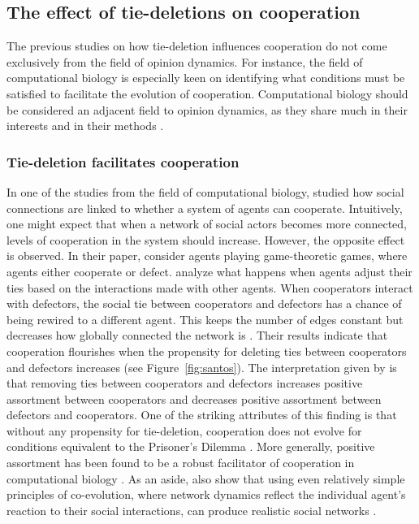 \documentclass[11pt]{article}
\begin{document}
\subsection{The effect of tie-deletions on cooperation}
The previous studies on how tie-deletion influences cooperation do not come exclusively from the field of opinion dynamics. For instance, the field of computational biology is especially keen on identifying what conditions must be satisfied to facilitate the evolution of cooperation. Computational biology should be considered an adjacent field to opinion dynamics, as they share much in their interests and in their methods \cite{dakin_dynamic_2018,melamed_strong_2016,pepper_mechanism_2002,santos_cooperation_2006, smaldino2019social}. 

\subsubsection{Tie-deletion facilitates cooperation}
\noindent In one of the studies from the field of computational biology,  studied how social connections are linked to whether a system of agents can cooperate. Intuitively, one might expect that when a network of social actors becomes more connected, levels of cooperation in the system should increase. However, the opposite effect is observed. In their paper,  consider agents playing game-theoretic games, where agents either cooperate or defect. 
 analyze what happens when agents adjust their ties based on the interactions made with other agents. When cooperators interact with defectors, the social tie between cooperators and defectors has a chance of being rewired to a different agent. This keeps the number of edges constant but decreases how globally connected the network is \cite{santos_cooperation_2006}. Their results indicate that cooperation flourishes when the propensity for deleting ties between cooperators and defectors increases (see Figure~\ref{fig:santos}). The interpretation given by  is that removing ties between cooperators and defectors increases positive assortment between cooperators and decreases positive assortment between defectors and cooperators. One of the striking attributes of this finding is that without any propensity for tie-deletion, cooperation does not evolve for conditions equivalent to the Prisoner's Dilemma \cite{santos_cooperation_2006}. More generally, positive assortment has been found to be a robust facilitator of cooperation in computational biology \cite{boyd_coordinated_2010,dakin_dynamic_2018,melamed_strong_2016,pepper_mechanism_2002}. As an aside,  also show that using even relatively simple principles of co-evolution, where network dynamics reflect the individual agent's reaction to their social interactions, can produce realistic social networks \cite{santos_cooperation_2006}. 
\end{document}
